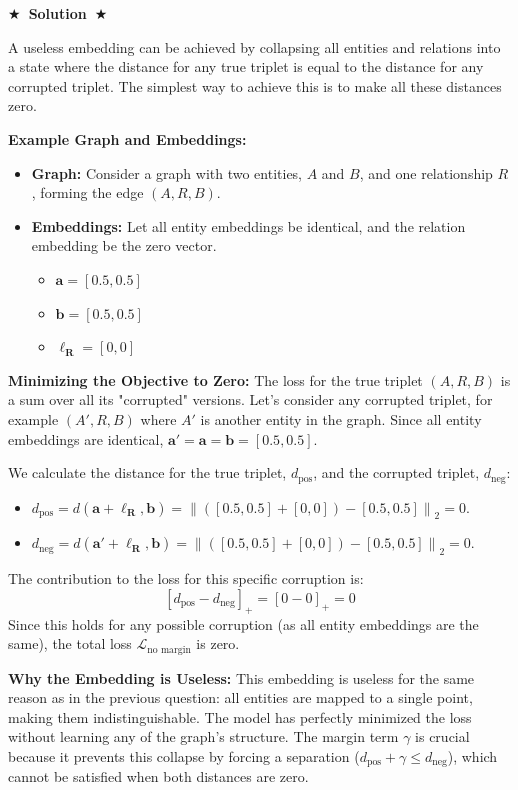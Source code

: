 \documentclass{article}
\numberwithin{figure}{section}
\newcommand{\Solution}[1]{%
    {%
        \medskip
        \color{red}
        \bf $\bigstar$~\sf\textbf{Solution}~$\bigstar$ \sf
        #1
    }
    \bigskip
}
\begin{document}
\Solution{
	A useless embedding can be achieved by collapsing all entities and relations into a state where the distance for any true triplet is equal to the distance for any corrupted triplet. The simplest way to achieve this is to make all these distances zero.
	
	\textbf{Example Graph and Embeddings:}
	\begin{itemize}
		\item \textbf{Graph:} Consider a graph with two entities, $A$ and $B$, and one relationship $R$, forming the edge $(A, R, B)$.
		\item \textbf{Embeddings:} Let all entity embeddings be identical, and the relation embedding be the zero vector.
		\begin{itemize}
			\item $\mathbf{a} = [0.5, 0.5]$
			\item $\mathbf{b} = [0.5, 0.5]$
			\item $\boldsymbol{\ell_R} = [0, 0]$
		\end{itemize}
	\end{itemize}
	
	\textbf{Minimizing the Objective to Zero:}
	The loss for the true triplet $(A, R, B)$ is a sum over all its "corrupted" versions. Let's consider any corrupted triplet, for example $(A', R, B)$ where $A'$ is another entity in the graph. Since all entity embeddings are identical, $\mathbf{a'} = \mathbf{a} = \mathbf{b} = [0.5, 0.5]$.
	
	We calculate the distance for the true triplet, $d_{\text{pos}}$, and the corrupted triplet, $d_{\text{neg}}$:
	\begin{itemize}
		\item $d_{\text{pos}} = d(\mathbf{a} + \boldsymbol{\ell_R}, \mathbf{b}) = \left\| ([0.5, 0.5] + [0, 0]) - [0.5, 0.5] \right\|_2 = 0$.
		\item $d_{\text{neg}} = d(\mathbf{a'} + \boldsymbol{\ell_R}, \mathbf{b}) = \left\| ([0.5, 0.5] + [0, 0]) - [0.5, 0.5] \right\|_2 = 0$.
	\end{itemize}
	
	The contribution to the loss for this specific corruption is:
	\[ [d_{\text{pos}} - d_{\text{neg}}]_+ = [0 - 0]_+ = 0 \]
	Since this holds for any possible corruption (as all entity embeddings are the same), the total loss $\mathcal{L}_{\text{no margin}}$ is zero.
	
	\textbf{Why the Embedding is Useless:}
	This embedding is useless for the same reason as in the previous question: all entities are mapped to a single point, making them indistinguishable. The model has perfectly minimized the loss without learning any of the graph's structure. The margin term $\gamma$ is crucial because it prevents this collapse by forcing a separation ($d_{\text{pos}} + \gamma \leq d_{\text{neg}}$), which cannot be satisfied when both distances are zero.
}
\end{document}
